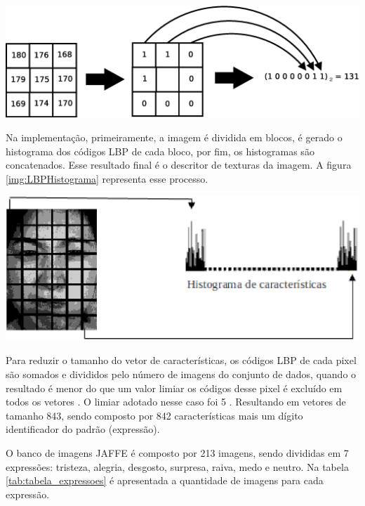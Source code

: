 \begin{itemize}
\begin{center}
	\includegraphics[scale=0.5]{graficos/LBP}
	\label{img:LBP}
\end{center}

Na implementação, primeiramente, a imagem é dividida em blocos, é gerado o histograma dos códigos LBP de cada bloco, por fim, os histogramas são concatenados. Esse resultado final é o descritor de texturas da imagem. A figura \ref{img:LBPHistograma} representa esse processo.

\begin{center}
	\includegraphics[scale=0.5]{graficos/histograma}
	\label{img:LBPHistograma}
\end{center}

Para reduzir o tamanho do vetor de características, os códigos LBP de cada pixel são somados e divididos pelo número de imagens do conjunto de dados, quando o resultado é menor do que um valor limiar os códigos desse pixel é excluído em todos os vetores \cite{Feng}. O limiar adotado nesse caso foi 5 \cite{LBPShan2009}. Resultando em vetores de tamanho 843, sendo composto por 842 características mais um dígito identificador do padrão (expressão). 

O banco de imagens JAFFE é composto por 213 imagens, sendo divididas em 7 expressões: tristeza, alegria, desgosto, surpresa, raiva, medo e neutro. Na tabela \ref{tab:tabela_expressoes} é apresentada a quantidade de imagens para cada expressão.


\end{itemize}
